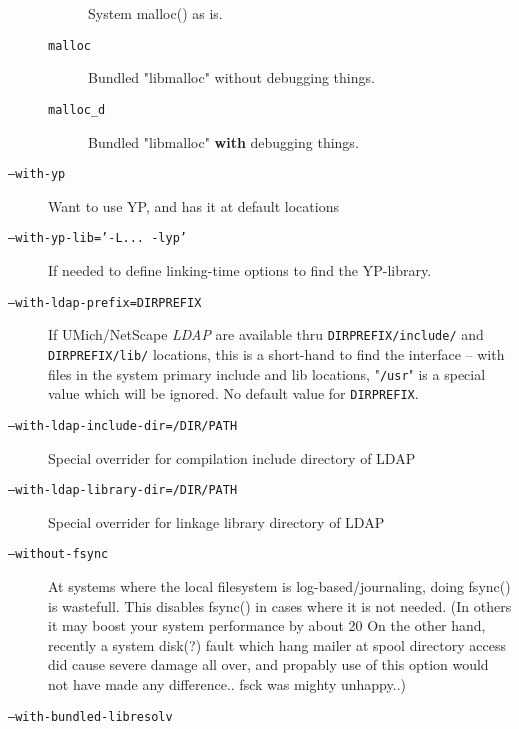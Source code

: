 \begin{description}
\begin{description}
System malloc() as is.

\item[\tt malloc] \mbox{}

Bundled "libmalloc" without debugging things.

\item[\tt malloc\_d] \mbox{}

Bundled "libmalloc" {\bf with} debugging things.
\end{description}

\item[\tt --with-yp] \mbox{}

Want to use YP, and has it at default locations

\item[\tt --with-yp-lib='-L... -lyp'] \mbox{}

If needed to define linking-time options to find the YP-library.

\item[\tt --with-ldap-prefix=DIRPREFIX] \mbox{}

If UMich/NetScape {\em LDAP} are available thru {\tt DIRPREFIX/include/}
and {\tt DIRPREFIX/lib/} locations, this is a short-hand to find
the interface -- with files in the system primary include
and lib locations,  "{\tt /usr}" is a special value which will be
ignored.  No default value for {\tt DIRPREFIX}.

\item[\tt --with-ldap-include-dir=/DIR/PATH] \mbox{}

Special overrider for compilation include directory of LDAP

\item[\tt --with-ldap-library-dir=/DIR/PATH] \mbox{}

Special overrider for linkage library directory of LDAP

\item[\tt --without-fsync] \mbox{}

At systems where the local filesystem is log-based/journaling,
doing   fsync()  is wastefull.  This disables fsync() in
cases where it is not needed.    (In others it may boost
your system performance by about 20%
On the other hand, recently a system disk(?) fault which
hang mailer at spool directory access did cause severe
damage all over, and propably use of this option would
not have made any difference..  fsck was mighty unhappy..)

\item[\tt --with-bundled-libresolv] \mbox{}


\end{description}
